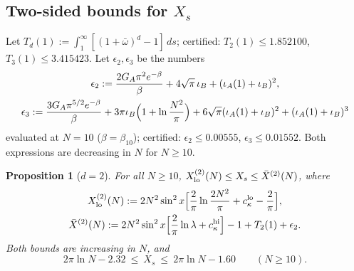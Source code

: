 \documentclass[11pt,a4paper]{article}
\newtheorem{proposition}[theorem]{Proposition}
\theoremstyle{definition}
\theoremstyle{remark}
\begin{document}
\subsection{Two-sided bounds for $X_s$}

Let $T_d(1):=\int_1^\infty[(1+\bar\omega)^d-1]\,ds$; certified: $T_2(1)\le1.852100$, $T_3(1)\le3.415423$. Let $\epsilon_2,\epsilon_3$ be the numbers
\begin{gather*}
\epsilon_2:=\frac{2G_A\pi^2e^{-\beta}}{\beta}+4\sqrt\pi\,\iota_B+(\iota_A(1)+\iota_B)^2, \\
\epsilon_3:=\frac{3G_A\pi^{5/2}e^{-\beta}}{\beta}+3\pi\iota_B\Bigl(1+\ln\frac{N^2}{\pi}\Bigr)+6\sqrt\pi(\iota_A(1)+\iota_B)^2+(\iota_A(1)+\iota_B)^3
\end{gather*}
evaluated at $N=10$ ($\beta=\beta_{10}$); certified: $\epsilon_2\le0.00555$, $\epsilon_3\le0.01552$. Both expressions are decreasing in $N$ for $N\ge10$.

\begin{proposition}[{$d=2$}]
For all $N\ge10$, $X^{(2)}_{\rm lo}(N)\le X_s\le\bar X^{(2)}(N)$, where
\begin{gather*}
X^{(2)}_{\rm lo}(N):=2N^2\sin^2x\Bigl[\frac2\pi\ln\frac{2N^2}{\pi}+c_\kappa^{\rm lo}-\frac2\pi\Bigr], \\
\bar X^{(2)}(N):=2N^2\sin^2x\Bigl[\frac2\pi\ln\lambda+c_\kappa^{\rm hi}\Bigr]-1+T_2(1)+\epsilon_2 .
\end{gather*}
Both bounds are increasing in $N$, and
\begin{equation*}
2\pi\ln N-2.32\ \le\ X_s\ \le\ 2\pi\ln N-1.60\qquad(N\ge10).
\end{equation*}
\end{proposition}
\end{document}
